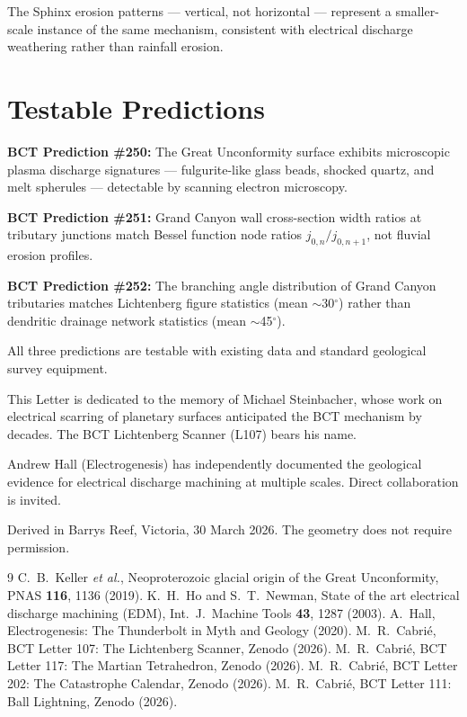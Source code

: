 \documentclass[aps,prl,twocolumn,superscriptaddress]{revtex4-2}
\begin{document}
The Sphinx erosion patterns --- vertical, not horizontal --- represent a smaller-scale instance of the same mechanism, consistent with electrical discharge weathering rather than rainfall erosion.

\section{Testable Predictions}

\textbf{BCT Prediction \#250:} The Great Unconformity surface exhibits microscopic plasma discharge signatures --- fulgurite-like glass beads, shocked quartz, and melt spherules --- detectable by scanning electron microscopy.

\textbf{BCT Prediction \#251:} Grand Canyon wall cross-section width ratios at tributary junctions match Bessel function node ratios $j_{0,n}/j_{0,n+1}$, not fluvial erosion profiles.

\textbf{BCT Prediction \#252:} The branching angle distribution of Grand Canyon tributaries matches Lichtenberg figure statistics (mean $\sim$30$^\circ$) rather than dendritic drainage network statistics (mean $\sim$45$^\circ$).

All three predictions are testable with existing data and standard geological survey equipment.

\begin{acknowledgments}
This Letter is dedicated to the memory of Michael Steinbacher, whose work on electrical scarring of planetary surfaces anticipated the BCT mechanism by decades. The BCT Lichtenberg Scanner (L107) bears his name.

Andrew Hall (Electrogenesis) has independently documented the geological evidence for electrical discharge machining at multiple scales. Direct collaboration is invited.

Derived in Barrys Reef, Victoria, 30 March 2026. The geometry does not require permission.
\end{acknowledgments}

\begin{thebibliography}{9}
 C.~B.~Keller \emph{et al.}, Neoproterozoic glacial origin of the Great Unconformity, PNAS \textbf{116}, 1136 (2019).
 K.~H.~Ho and S.~T.~Newman, State of the art electrical discharge machining (EDM), Int.\ J.\ Machine Tools \textbf{43}, 1287 (2003).
 A.~Hall, Electrogenesis: The Thunderbolt in Myth and Geology (2020).
 M.~R.~Cabri\'e, BCT Letter 107: The Lichtenberg Scanner, Zenodo (2026).
 M.~R.~Cabri\'e, BCT Letter 117: The Martian Tetrahedron, Zenodo (2026).
 M.~R.~Cabri\'e, BCT Letter 202: The Catastrophe Calendar, Zenodo (2026).
 M.~R.~Cabri\'e, BCT Letter 111: Ball Lightning, Zenodo (2026).
\end{thebibliography}
\end{document}
